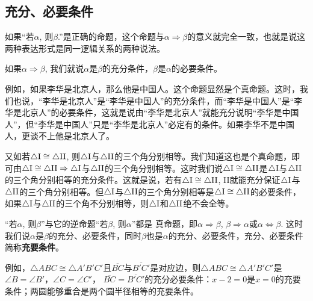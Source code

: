 \subsection{充分、必要条件}

如果“若$\alpha$, 则$\beta$.”是正确的命题，这个命题与$\alpha\Rightarrow\beta$的意义就完全一致，也就是说这两种表达形式是同一逻辑关系的两种说法。

\begin{blk}{}
  如果$\alpha\Rightarrow\beta$, 我们就说$\alpha$是$\beta$的充分条件，$\beta$是$\alpha$的必要条件。  
\end{blk}

例如，如果李华是北京人，那么他是中国人。这个命题显然是个真命题。这时，我们也说，“李华是北京人”是“李华是中国人”的充分条件，而“李华是中国人”是“李华是北京人”的必要条件，这就是说由“李华是北京人”就能充分说明“李华是中国人”，但“李华是中国人”只是“李华是北京人”必定有的条件。如果李华不是中国人，更谈不上他是北京人了。

又如若$\triangle {\rm I}\cong \triangle {\rm II}$, 则$\triangle {\rm I}$与$\triangle {\rm II}$的三个角分别相等。我们知道这也是个真命题，即可由$\triangle {\rm I}\cong \triangle {\rm II}\Rightarrow \triangle {\rm I}$与$\triangle {\rm II}$的三个角分别相等。这时我们说$\triangle {\rm I}\cong \triangle {\rm II}$是$\triangle {\rm I}$与$\triangle {\rm II}$的三个角分别相等的充分条件。这就是说，若有$\triangle {\rm I}\cong\triangle {\rm II}$, II就能充分保证$\triangle {\rm I}$与$\triangle {\rm II}$的三个角分别相等。但$\triangle {\rm I}$与$\triangle {\rm II}$的三个角分别相等是$\triangle {\rm I}\cong \triangle {\rm II}$的必要条件，如果$\triangle {\rm I}$与$\triangle {\rm II}$的三个角不分别相等，则$\triangle {\rm I}$和$\triangle {\rm II}$绝不会全等。

“若$\alpha$, 则$\beta$”与它的逆命题“若$\beta$, 则$\alpha$”都是
真命题，即$\alpha\Rightarrow\beta$, $\beta\Rightarrow\alpha$或$\alpha\Leftrightarrow\beta$. 这时我们说$\alpha$是$\beta$的充分、必要条件，同时$\beta$也是$\alpha$的充分、必要条件，充分、必要条件简称\textbf{充要条件}。

例如，$\triangle ABC\cong \triangle A'B'C'$且$\overline{BC}$与$\overline{B'C'}$是对应边，则$\triangle ABC\cong \triangle A'B'C'$是
$\angle B=\angle B'$，$\angle C=\angle C'$，
$\overline{BC}=\overline{B'C'}$的充分必要条件：$x-2=0$是$x=0$的充要条件；两圆能够重合是两个圆半径相等的充要条件。

